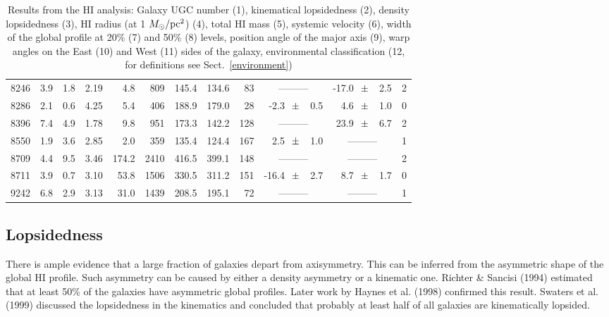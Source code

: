 \documentclass{aa}
\begin{document}
\begin{center}
\begin{table}
\begin{center}
\begin{tabular}{crrcrrrrrrlrlc}
8246 & 3.9 & 1.8 & 2.19 & 4.8 & 809 & 145.4 & 134.6 & 83 & \multicolumn{2}{c}{---------} & -17.0$\hspace{2.5mm}\pm$ &2.5 & 2 \\
8286 & 2.1 & 0.6 & 4.25 & 5.4 & 406 & 188.9 & 179.0 & 28 & -2.3$\hspace{2.5mm}\pm$ &0.5 & 4.6$\hspace{2.5mm}\pm$ &1.0 & 0 \\
8396 & 7.4 & 4.9 & 1.78 & 9.8 & 951 & 173.3 & 142.2 & 128 & \multicolumn{2}{c}{---------} & 23.9$\hspace{2.5mm}\pm$ &6.7 & 2 \\
8550 & 1.9 & 3.6 & 2.85 & 2.0 & 359 & 135.4 & 124.4 & 167 & 2.5$\hspace{2.5mm}\pm$ &1.0 & \multicolumn{2}{c}{---------} & 1 \\
8709 & 4.4 & 9.5 & 3.46 & 174.2 & 2410 & 416.5 & 399.1 & 148 & \multicolumn{2}{c}{---------} & \multicolumn{2}{c}{---------} & 2 \\
8711 & 3.9 & 0.7 & 3.10 & 53.8 & 1506 & 330.5 & 311.2 & 151 & -16.4$\hspace{2.5mm}\pm$ &2.7 & 8.7$\hspace{2.5mm}\pm$ &1.7 & 0 \\
9242 & 6.8 & 2.9 & 3.13 & 31.0 & 1439 & 208.5 & 195.1 & 72 & \multicolumn{2}{c}{---------} & \multicolumn{2}{c}{---------} & 1 \\
\hline
\end{tabular}
\caption{Results from the HI analysis: Galaxy UGC number (1),
  kinematical lopsidedness (2), density lopsidedness (3), HI radius
  (at 1 $M_{\odot}/{\rm pc}^2$)
  (4), total HI mass (5), systemic velocity (6), width of the global
  profile at 20\% (7) and 50\% (8) levels, position angle of the major
  axis (9), warp angles on the East (10) and West (11) sides of
  the galaxy, environmental classification (12, for definitions see 
  Sect.~\ref{environment})}
\label{tab:results}
\end{center}
\end{table}
\end{center}

\subsection{Lopsidedness}

There is ample evidence that a large fraction of galaxies depart from
axisymmetry. This can be inferred from the asymmetric shape of the
global HI profile. Such asymmetry can be caused by either a density
asymmetry or a 
kinematic one. Richter \& Sancisi (1994) estimated that
at least 50\% of the galaxies have asymmetric global profiles. Later
work by Haynes et al. (1998) confirmed this 
result. Swaters et al. (1999) discussed the lopsidedness in
the kinematics and concluded that probably at least half of all galaxies
are kinematically lopsided.
\end{document}
